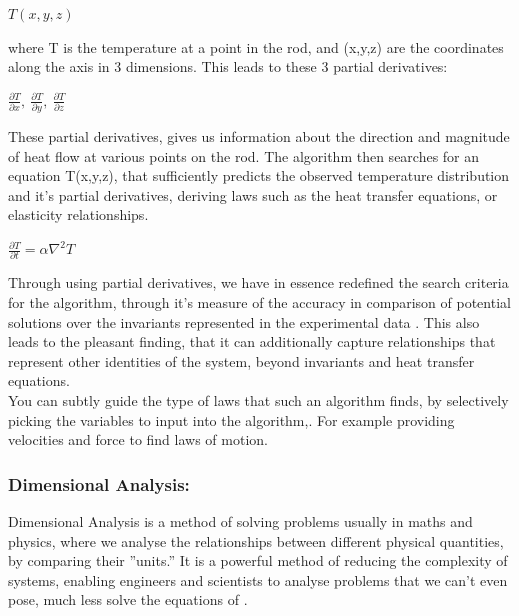 \documentclass{article}
\begin{document}
\begin{center}
$T(x,y,z)$
\end{center}

where T is the temperature at a point in the rod, and (x,y,z) are the coordinates along the axis in 3 dimensions. This leads to these 3 partial derivatives: \\ 

\begin{center}
 $\frac{\partial T}{\partial x}, \  \frac{\partial T}{\partial y}, \  \frac{\partial T}{\partial z}$
\end{center}

These partial derivatives, gives us information about the direction and magnitude of heat flow at various points on the rod. The algorithm then searches for an equation T(x,y,z), that sufficiently predicts the observed temperature distribution and it's partial derivatives, deriving laws such as the heat transfer equations, or elasticity relationships.\\ 

\begin{center}
$\frac{\partial T}{\partial t} = \alpha \nabla^2 T$
\end{center}



Through using partial derivatives, we have in essence redefined the search criteria for the algorithm, through it's measure of the accuracy in comparison of potential solutions over the invariants represented in the experimental data \cite{Kelly2021} . This also leads to the pleasant finding, that it can additionally capture relationships that represent other identities of the system, beyond invariants and heat transfer equations. \\ 

You can subtly guide the type of laws that such an algorithm finds, by selectively picking the variables to input into the algorithm,. For example providing velocities and force to find laws of motion. \\ 




\subsubsection{Dimensional Analysis: }

Dimensional Analysis is a method of solving problems usually in maths and physics, where we analyse
the relationships between different physical quantities, by comparing their ”units.” It is a powerful
method of reducing the complexity of systems, enabling engineers and scientists to analyse problems
that we can’t even pose, much less solve the equations of \cite{Longo2021}.\\
\end{document}

